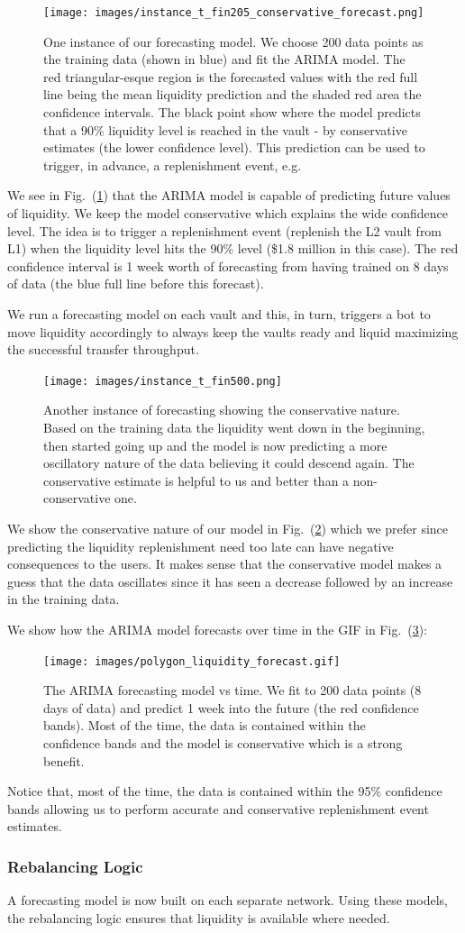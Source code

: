 %
%
\begin{figure}
    \centering
    \texttt{[image: images/instance\_t\_fin205\_conservative\_forecast.png]}
    \caption{One instance of our forecasting model. We choose 200 data points as the training data (shown in blue) and fit the ARIMA model. The red triangular-esque region is the forecasted values with the red full line being the mean liquidity prediction and the shaded red area the confidence intervals. The black point show where the model predicts that a 90\% liquidity level is reached in the vault - by conservative estimates (the lower confidence level). This prediction can be used to trigger, in advance, a replenishment event, e.g.}
    \label{fig:conserv}
\end{figure}
%
We see in Fig.~(\ref{fig:conserv}) that the ARIMA model is capable of predicting future values of liquidity. We keep the model conservative which explains the wide confidence level. The idea is to trigger a replenishment event (replenish the L2 vault from L1) when the liquidity level hits the 90\% level (\$1.8 million in this case).
%
The red confidence interval is 1 week worth of forecasting from having trained on 8 days of data (the blue full line before this forecast).

We run a forecasting model on each vault and this, in turn, triggers a bot to move liquidity accordingly to always keep the vaults ready and liquid maximizing the successful transfer throughput.
%
\begin{figure}
    \centering
    \texttt{[image: images/instance\_t\_fin500.png]}
    \caption{Another instance of forecasting showing the conservative nature. Based on the training data the liquidity went down in the beginning, then started going up and the model is now predicting a more oscillatory nature of the data believing it could descend again. The conservative estimate is helpful to us and better than a non-conservative one.}
    \label{fig:conserv2}
\end{figure}
%
We show the conservative nature of our model in Fig.~(\ref{fig:conserv2}) which we prefer since predicting the liquidity replenishment need too late can have negative consequences to the users.
%
It makes sense that the conservative model makes a guess that the data oscillates since it has seen a decrease followed by an increase in the training data.

We show how the ARIMA model forecasts over time in the GIF in Fig.~(\ref{fig:gif}):
%
\begin{figure}
    \centering
    \texttt{[image: images/polygon\_liquidity\_forecast.gif]}
    \caption{The ARIMA forecasting model vs time. We fit to 200 data points (8 days of data) and predict 1 week into the future (the red confidence bands). Most of the time, the data is contained within the confidence bands and the model is conservative which is a strong benefit.}
    \label{fig:gif}
\end{figure}
%
Notice that, most of the time, the data is contained within the 95\% confidence bands allowing us to perform accurate and conservative replenishment event estimates.

\subsubsection*{Rebalancing Logic}

A forecasting model is now built on each separate network. Using these models, the rebalancing logic ensures that liquidity is available where needed.

